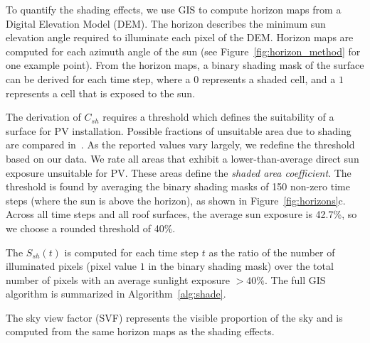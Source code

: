To quantify the shading effects, we use GIS to compute horizon maps from a Digital Elevation Model (DEM). 
The horizon describes the minimum sun elevation angle required to illuminate each pixel of the DEM. 
Horizon maps are computed for each azimuth angle of the sun (see Figure~\ref{fig:horizon_method} for one example point). From the horizon maps, a binary shading mask of the surface can be derived for each time step, where a $0$ represents a shaded cell, and a $1$ represents a cell that is exposed to the sun.

The derivation of $C_{sh}$ requires a threshold which defines the suitability of a surface for PV installation. Possible fractions of unsuitable area due to shading are compared in~\cite{wiginton_quantifying_2010}. As the reported values vary largely, we redefine the threshold based on our data. We rate all areas that exhibit a lower-than-average direct sun exposure unsuitable for PV. These areas define the \textit{shaded area coefficient}. The threshold is found by averaging the binary shading masks of 150 non-zero time steps (where the sun is above the horizon), as shown in Figure~\ref{fig:horizons}c. Across all time steps and all roof surfaces, the average sun exposure is 42.7\%, so we choose a rounded threshold of 40\%.

The $S_{sh}(t)$ is computed for each time step $t$ as the ratio of the number of illuminated pixels (pixel value $1$ in the binary shading mask) over the total number of pixels with an average sunlight exposure $> 40\%$. The full GIS algorithm is summarized in Algorithm~\ref{alg:shade}. 

The sky view factor (SVF) represents the visible proportion of the sky and is computed from the same horizon maps as the shading effects.

